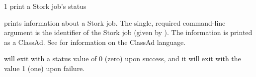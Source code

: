 \begin{ManPage}{\label{man-stork-status}}{1}
{print a Stork job's status}
\Synopsis {}
\ToolArgsBase

\Storkname
{}



\Description 

 prints information about a Stork job.
The single, required command-line argument is the identifier
of the Stork job (given by ).
The information is printed as a ClassAd.
See  for information
on the ClassAd language.


\begin{Options}
	\ToolArgsBaseDesc
	\StorknameDesc
\end{Options}

\ExitStatus

 will exit with a status value of 0 (zero) upon success,
and it will exit with the value 1 (one) upon failure.

\end{ManPage}
